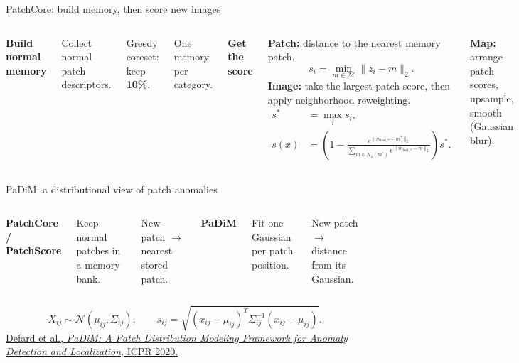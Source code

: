 \documentclass[aspectratio=169,professionalfonts,10pt]{beamer}
\newcommand{\head}[1]{\par{\normalsize\bfseries\color{navy}#1}\par\vspace{2pt}}
\begin{document}
\begin{frame}[t]{PatchCore: build memory, then score new images}
\vspace{.48cm}
\begin{columns}[T,onlytextwidth]
\head{Build normal memory}
Collect normal patch descriptors.
\par\vspace{.28cm}
Greedy coreset: keep \textbf{10\%}.
\par\vspace{.28cm}
One memory per category.
\head{Get the score}
\textbf{Patch:} distance to the nearest memory patch.
\[
s_i=\min_{m\in\mathcal M}\|z_i-m\|_2.
\]
\textbf{Image:} take the largest patch score, then apply neighborhood reweighting.
\[
\begin{aligned}
s^*&=\max_i s_i,\\
s(x)&=\left(1-\frac{e^{\|m_{\mathrm{test},*}-m^*\|_2}}
{\sum_{m\in\mathcal N_b(m^*)}e^{\|m_{\mathrm{test},*}-m\|_2}}\right)s^*.
\end{aligned}
\]
\par\vspace{.28cm}
\textbf{Map:} arrange patch scores, upsample, smooth (Gaussian blur).
\end{columns}
\end{frame}

\begin{frame}[t]{PaDiM: a distributional view of patch anomalies}
\vspace{.45cm}
\begin{columns}[T,onlytextwidth]
\head{PatchCore / PatchScore}
Keep normal patches in a memory bank.
\par\vspace{.24cm}
New patch $\rightarrow$ nearest stored patch.
\head{PaDiM}
Fit one Gaussian per patch position.
\par\vspace{.24cm}
New patch $\rightarrow$ distance from its Gaussian.
\end{columns}
\vspace{.55cm}
\[
X_{ij}\sim\mathcal{N}(\mu_{ij},\Sigma_{ij}),\qquad
s_{ij}=\sqrt{(x_{ij}-\mu_{ij})^T\Sigma_{ij}^{-1}(x_{ij}-\mu_{ij})}.
\]
\vfill
{\scriptsize\textcolor{teal}{\href{https://arxiv.org/abs/2011.08785}{Defard et al., \textit{PaDiM: A Patch Distribution Modeling Framework for Anomaly Detection and Localization}, ICPR 2020.}}}
\end{frame}
\end{document}
